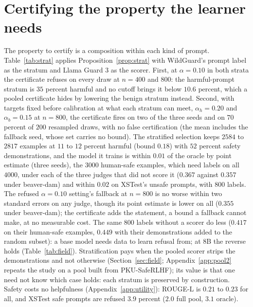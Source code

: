\documentclass{article} %
\makeatletter
\newcommand{\tabinput}[1]{\@@input#1 }
\makeatother
\begin{document}
\section{Certifying the property the learner needs}
\label{sec:strat}
\begin{table}[t]
\centering\small
\caption{Stratified certification on the $25$-percent pool with Llama Guard 3 as scorer (Qwen2.5-0.5B; seeds as in Table~\ref{tab:step2}); cert.\ is certified seeds out of three (five for the pooled certified set); the two $n = 800$ rows without a scorer spend the same labels as the stratified certificate. Bold and gray follow Section~\ref{sec:protocol}.}
\label{tab:strat}
\resizebox{\linewidth}{!}{\tabinput{data/tables/strat.tex}}
\end{table}
The property to certify is a composition within each kind of prompt. Table~\ref{tab:strat} applies Proposition~\ref{prop:strat} with WildGuard's prompt label as the stratum and Llama Guard 3 as the scorer. First, at $\alpha = 0.10$ in both strata the certificate refuses on every draw at $n = 400$ and $800$: the harmful-prompt stratum is $35$ percent harmful and no cutoff brings it below $10.6$ percent, which a pooled certificate hides by lowering the benign stratum instead. Second, with targets fixed before calibration at what each stratum can meet, $\alpha_h = 0.20$ and $\alpha_b = 0.15$ at $n = 800$, the certificate fires on two of the three seeds and on $70$ percent of $200$ resampled draws, with no false certification (the mean includes the fallback seed, whose set carries no bound). The stratified selection keeps $2584$ to $2817$ examples at $11$ to $12$ percent harmful (bound $0.18$) with $52$ percent safety demonstrations, and the model it trains is within $0.01$ of the oracle by point estimate (three seeds), the $3000$ human-safe examples, which need labels on all $4000$, under each of the three judges that did not score it ($0.367$ against $0.357$ under beaver-dam) and within $0.02$ on XSTest's unsafe prompts, with $800$ labels. The refused $\alpha = 0.10$ setting's fallback at $n = 800$ is no worse within two standard errors on any judge, though its point estimate is lower on all ($0.355$ under beaver-dam); the certificate adds the statement, a bound a fallback cannot make, at no measurable cost. The same $800$ labels without a scorer do less ($0.417$ on their human-safe examples, $0.449$ with their demonstrations added to the random subset): a base model needs data to learn refusal from; at 8B the reverse holds (Table~\ref{tab:field}). Stratification pays when the pooled scorer strips the demonstrations and not otherwise (Section~\ref{sec:field}; Appendix~\ref{app:pool2} repeats the study on a pool built from PKU-SafeRLHF); its value is that one need not know which case holds: each stratum is preserved by construction. Safety costs no helpfulness (Appendix~\ref{app:utility}): ROUGE-L is $0.21$ to $0.23$ for all, and XSTest safe prompts are refused $3.9$ percent ($2.0$ full pool, $3.1$ oracle).
\end{document}
